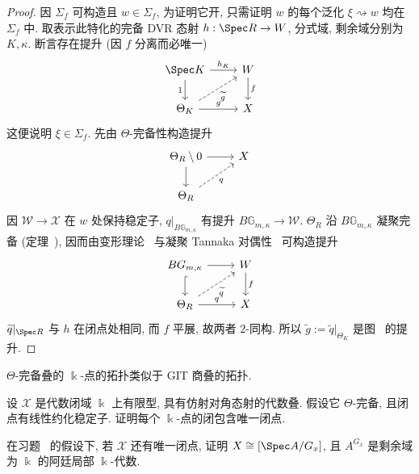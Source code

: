 \begin{proof}
因 $\Sigma_f$ 可构造且 $w\in\Sigma_f$, 为证明它开, 只需证明 $w$ 的每个泛化 $\xi\rightsquigarrow w$ 均在 $\Sigma_f$ 中. 取表示此特化的完备 DVR 态射 $h:\Spec R\to\mathcal W$, 分式域, 剩余域分别为 $K,\kappa$. 断言存在提升 (因 $f$ 分离而必唯一)
\begin{align}\label{src:7.10.14}
\begin{tikzcd}[ampersand replacement=\&]\Spec K\arrow[r,"{h_K}"]\arrow[d,"{1}"']\&\mathcal W\arrow[d,"{f}"]\\\Theta_K\arrow[r,"{g}"]\arrow[ur,dashed,"{\widetilde g}"']\&\mathcal X\end{tikzcd}
\end{align}
这便说明 $\xi\in\Sigma_f$. 先由 $\Theta$-完备性构造提升
\[\begin{tikzcd}[ampersand replacement=\&]\Theta_R\setminus0\arrow[r]\arrow[d]\&\mathcal X\\\Theta_R\arrow[ur,dashed,"{q}"']\&\end{tikzcd}\]
因 $\mathcal W\to\mathcal X$ 在 $w$ 处保持稳定子, $q|_{B\mathbb G_{m,\kappa}}$ 有提升 $B\mathbb G_{m,\kappa}\to\mathcal W$. $\Theta_R$ 沿 $B\mathbb G_{m,\kappa}$ 凝聚完备 (定理~), 因而由变形理论~ 与凝聚 Tannaka 对偶性~ 可构造提升
\[\begin{tikzcd}[ampersand replacement=\&]B\mathbb G_{m,\kappa}\arrow[r]\arrow[d,hook]\&\mathcal W\arrow[d,"{f}"]\\\Theta_R\arrow[r,"{q}"]\arrow[ur,dashed,"{\widetilde q}"']\&\mathcal X\end{tikzcd}\]
$\widetilde q|_{\Spec R}$ 与 $h$ 在闭点处相同, 而 $f$ 平展, 故两者 $2$-同构. 所以 $\widetilde g:=\widetilde q|_{\Theta_K}$ 是图~ 的提升.
\end{proof}
$\Theta$-完备叠的 $\Bbbk$-点的拓扑类似于 GIT 商叠的拓扑.
\begin{exercise}\label{src:7.10.15}
设 $\mathcal X$ 是代数闭域 $\Bbbk$ 上有限型, 具有仿射对角态射的代数叠. 假设它 $\Theta$-完备, 且闭点有线性约化稳定子. 证明每个 $\Bbbk$-点的闭包含唯一闭点.
\end{exercise}
\begin{exercise}\label{src:7.10.16}
在习题~ 的假设下, 若 $\mathcal X$ 还有唯一闭点, 证明 $\mathcal X\cong[\Spec A/G_x]$, 且 $A^{G_x}$ 是剩余域为 $\Bbbk$ 的阿廷局部 $\Bbbk$-代数.
\end{exercise}
